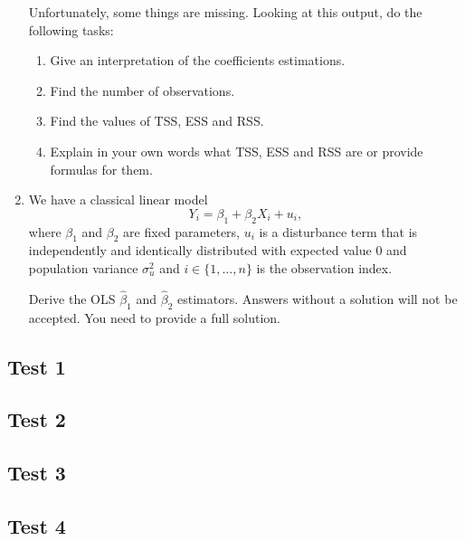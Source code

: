 \begin{enumerate}

Unfortunately, some things are missing. Looking at this output, do the following tasks:

\begin{enumerate}
    \item 
    Give an interpretation of the coefficients estimations.
    
    \item
    Find the number of observations.
    
    \item
    Find the values of TSS, ESS and RSS.
    
    \item
    Explain in your own words what TSS, ESS and RSS are or provide formulas for them.
\end{enumerate}


\item We have a classical linear model 
\[
    Y_i = \beta_1 + \beta_2 X_i + u_i,
\]
where $\beta_1$ and $\beta_2$ are fixed parameters, $u_i$ is a disturbance term that is independently and identically distributed with expected value 0 and population variance $\sigma_u^2$ 
and $i \in \{1, \ldots, n\}$ is the observation index.

Derive the OLS  $\hat \beta_1$ and $\hat \beta_2$ estimators. 
Answers without a solution will not be accepted. You need to provide a full solution.
\end{enumerate}



\subsection{Test 1}


\subsection{Test 2}


\subsection{Test 3}


\subsection{Test 4}
